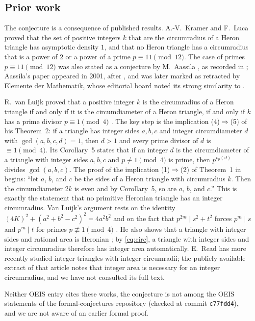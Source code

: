 \documentclass[11pt]{amsart}
\theoremstyle{plain}
\theoremstyle{definition}
\begin{document}
\subsection*{Prior work}
The conjecture is a consequence of published results. A.-V.~Kramer and F.~Luca \cite[Proposition~6]{KL} proved that the set of positive integers $k$ that are the circumradius of a Heron triangle has asymptotic density $1$, and that no Heron triangle has a circumradius that is a power of $2$ or a power of a prime $p\equiv 11\pmod{12}$. The case of primes $p\equiv11\pmod{12}$ was also stated as a conjecture by M.~Aassila \cite{Aa}, as recorded in \cite{vL}; Aassila's paper appeared in 2001, after \cite{KL}, and was later marked as retracted by Elemente der Mathematik, whose editorial board noted its strong similarity to \cite{KL}.

R.~van Luijk \cite{vL} proved that a positive integer $k$ is the circumradius of a Heron triangle if and only if it is the circumdiameter of a Heron triangle, if and only if $k$ has a prime divisor $p\equiv1\pmod 4$ \cite[Theorem~1]{vL}. The key step is the implication (4)$\Rightarrow$(5) of his Theorem~2: if a triangle has integer sides $a,b,c$ and integer circumdiameter $d$ with $\gcd(a,b,c,d)=1$, then $d>1$ and every prime divisor of $d$ is $\equiv1\pmod4$. Its Corollary~5 states that if an integer $d$ is the circumdiameter of a triangle with integer sides $a,b,c$ and $p\not\equiv1\pmod 4$ is prime, then $p^{v_p(d)}$ divides $\gcd(a,b,c)$. The proof of the implication (1)$\Rightarrow$(2) of Theorem~1 in \cite{vL} begins: ``let $a$, $b$, and $c$ be the sides of a Heron triangle with circumradius $k$. Then the circumdiameter $2k$ is even and by Corollary~5, so are $a$, $b$, and $c$.'' This is exactly the statement that no primitive Heronian triangle has an integer circumradius. Van Luijk's argument rests on the identity $(4K)^2+(a^2+b^2-c^2)^2=4a^2b^2$ and on the fact that $p^{2m}\mid s^2+t^2$ forces $p^m\mid s$ and $p^m\mid t$ for primes $p\not\equiv1\pmod4$ \cite[Lemma~4]{vL}. He also shows that a triangle with integer sides and rational area is Heronian \cite[Lemma~3]{vL}; by \eqref{eq:circ}, a triangle with integer sides and integer circumradius therefore has integer area automatically. E.~Read \cite{Read} has more recently studied integer triangles with integer circumradii; the publicly available extract of that article notes that integer area is necessary for an integer circumradius, and we have not consulted its full text.

Neither OEIS entry cites these works, the conjecture is not among the OEIS statements of the formal-conjectures repository \cite{FC} (checked at commit \texttt{c77fdd4}), and we are not aware of an earlier formal proof.
\end{document}
